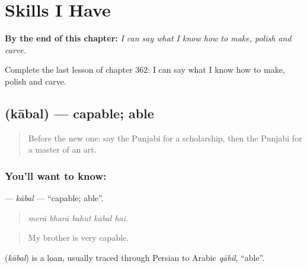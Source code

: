 
\chapter{Skills I Have}
\label{ch:pa-a2-skills-i-have}

\begin{chapteropening}
\textbf{By the end of this chapter:} \emph{I can say what I know how to make, polish and carve.}

Complete the last lesson of chapter 362: I can say what I know how to make, polish and carve.
\end{chapteropening}

\section[\texorpdfstring{\pa{ਕਾਬਲ} (kābal)}{ਕਾਬਲ (kābal)}]{ (kābal) — capable; able}

\label{lesson:PA-C362-kabal}



\begin{quote}
Before the new one: say the Punjabi for a scholarship, then the Punjabi for a master of an art.
\end{quote}

\subsection*{You'll want to know: }
\textbf{} — \emph{kābal} — \textquotedblleft{}capable; able\textquotedblright{}.

\begin{quote}
    
\end{quote}

\begin{quote}
\emph{merā bharā bahut kābal hai.}
\end{quote}

\begin{quote}
My brother is very capable.
\end{quote}

\begin{cousinweb}
\textbf{} (\emph{kābal}) is a loan, usually traced through Persian to Arabic \emph{qābil}, \textquotedblleft{}able\textquotedblright{}.
\end{cousinweb}

